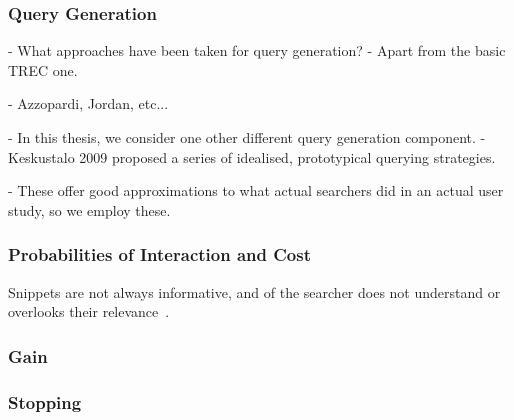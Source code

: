 \subsubsection{Query Generation}
- What approaches have been taken for query generation?
- Apart from the basic TREC one.

- Azzopardi, Jordan, etc...

- In this thesis, we consider one other different query generation component.
- Keskustalo 2009 proposed a series of idealised, prototypical querying strategies.

- These offer good approximations to what actual searchers did in an actual user study, so we employ these.

\subsubsection{Probabilities of Interaction and Cost}


Snippets are not always informative, and of the searcher does not understand or overlooks their relevance~\citep{turpin2009summaries}.



\subsubsection{Gain}


\subsubsection{Stopping}





